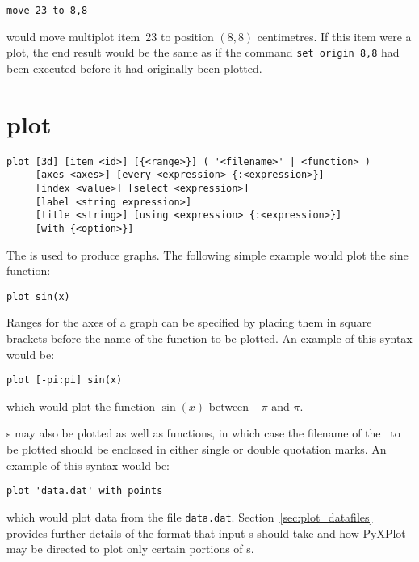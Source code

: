 \begin{verbatim}
move 23 to 8,8
\end{verbatim}

\noindent would move multiplot item~23 to position $(8,8)$ centimetres. If this
item were a plot, the end result would be the same as if the command {\tt set
origin 8,8} had been executed before it had originally been plotted.


\section{plot}

\begin{verbatim}
plot [3d] [item <id>] [{<range>}] ( '<filename>' | <function> )
     [axes <axes>] [every <expression> {:<expression>}]
     [index <value>] [select <expression>]
     [label <string expression>]
     [title <string>] [using <expression> {:<expression>}]
     [with {<option>}]
\end{verbatim}

The  is used to produce graphs. The following simple example
would plot the sine function:

\begin{verbatim}
plot sin(x)
\end{verbatim}

Ranges for the axes of a graph can be specified by placing them in
square brackets before the name of the function to be plotted. An example of
this syntax would be:

\begin{verbatim}
plot [-pi:pi] sin(x)
\end{verbatim}

\noindent which would plot the function $\sin(x)$ between $-\pi$ and $\pi$.

\Datafile s may also be plotted as well as functions, in which case the
filename of the \datafile\ to be plotted should be enclosed in either single or
double quotation marks. An example of this syntax would be:

\begin{verbatim}
plot 'data.dat' with points
\end{verbatim}

\noindent which would plot data from the file {\tt data.dat}.
Section~\ref{sec:plot_datafiles} provides further details of the format that
input \datafile s should take and how PyXPlot may be directed to plot only
certain portions of \datafile s.

